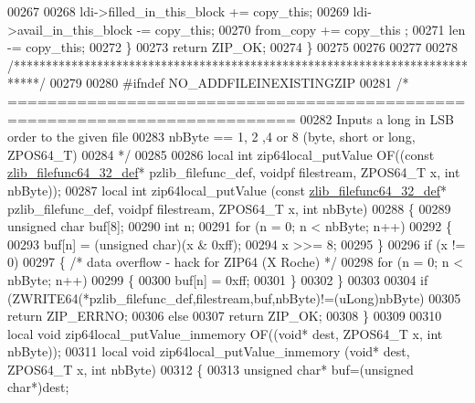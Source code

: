\begin{DoxyCode}
00267 
00268         ldi->filled\_in\_this\_block += copy\_this;
00269         ldi->avail\_in\_this\_block -= copy\_this;
00270         from\_copy += copy\_this ;
00271         len -= copy\_this;
00272     \}
00273     \textcolor{keywordflow}{return} ZIP\_OK;
00274 \}
00275 
00276 
00277 
00278 \textcolor{comment}{/****************************************************************************/}
00279 
00280 \textcolor{preprocessor}{#ifndef NO\_ADDFILEINEXISTINGZIP}
00281 \textcolor{comment}{/* ===========================================================================}
00282 \textcolor{comment}{   Inputs a long in LSB order to the given file}
00283 \textcolor{comment}{   nbByte == 1, 2 ,4 or 8 (byte, short or long, ZPOS64\_T)}
00284 \textcolor{comment}{*/}
00285 
00286 local \textcolor{keywordtype}{int} zip64local\_putValue OF((\textcolor{keyword}{const} \hyperlink{structzlib__filefunc64__32__def__s}{zlib\_filefunc64\_32\_def}* pzlib\_filefunc\_def, 
      voidpf filestream, ZPOS64\_T x, \textcolor{keywordtype}{int} nbByte));
00287 local \textcolor{keywordtype}{int} zip64local\_putValue (\textcolor{keyword}{const} \hyperlink{structzlib__filefunc64__32__def__s}{zlib\_filefunc64\_32\_def}* pzlib\_filefunc\_def, 
      voidpf filestream, ZPOS64\_T x, \textcolor{keywordtype}{int} nbByte)
00288 \{
00289     \textcolor{keywordtype}{unsigned} \textcolor{keywordtype}{char} buf[8];
00290     \textcolor{keywordtype}{int} n;
00291     \textcolor{keywordflow}{for} (n = 0; n < nbByte; n++)
00292     \{
00293         buf[n] = (\textcolor{keywordtype}{unsigned} char)(x & 0xff);
00294         x >>= 8;
00295     \}
00296     \textcolor{keywordflow}{if} (x != 0)
00297       \{     \textcolor{comment}{/* data overflow - hack for ZIP64 (X Roche) */}
00298       \textcolor{keywordflow}{for} (n = 0; n < nbByte; n++)
00299         \{
00300           buf[n] = 0xff;
00301         \}
00302       \}
00303 
00304     \textcolor{keywordflow}{if} (ZWRITE64(*pzlib\_filefunc\_def,filestream,buf,nbByte)!=(uLong)nbByte)
00305         \textcolor{keywordflow}{return} ZIP\_ERRNO;
00306     \textcolor{keywordflow}{else}
00307         \textcolor{keywordflow}{return} ZIP\_OK;
00308 \}
00309 
00310 local \textcolor{keywordtype}{void} zip64local\_putValue\_inmemory OF((\textcolor{keywordtype}{void}* dest, ZPOS64\_T x, \textcolor{keywordtype}{int} nbByte));
00311 local \textcolor{keywordtype}{void} zip64local\_putValue\_inmemory (\textcolor{keywordtype}{void}* dest, ZPOS64\_T x, \textcolor{keywordtype}{int} nbByte)
00312 \{
00313     \textcolor{keywordtype}{unsigned} \textcolor{keywordtype}{char}* buf=(\textcolor{keywordtype}{unsigned} \textcolor{keywordtype}{char}*)dest;

\end{DoxyCode}
